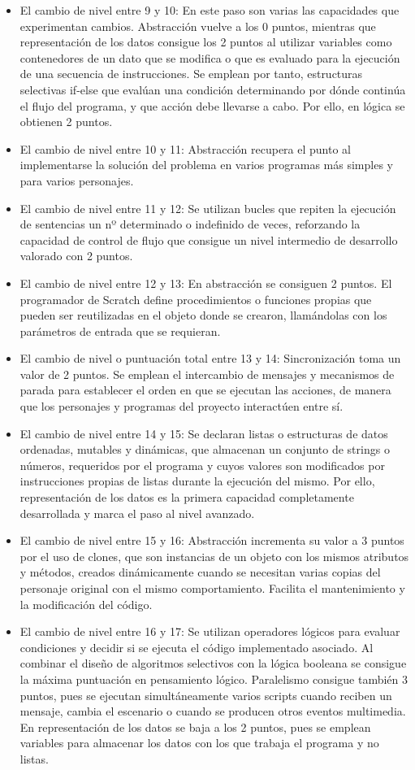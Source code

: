 \documentclass[a4paper, 12pt]{book}
\begin{document}
\begin{itemize}
 \item El cambio de nivel entre 9 y 10: En este paso son varias las capacidades que experimentan cambios. Abstracción vuelve a los 0 puntos, mientras que representación de los datos consigue los 2 puntos al utilizar variables como contenedores de un dato que se modifica o que es evaluado para la ejecución de una secuencia de instrucciones. Se emplean por tanto, estructuras selectivas if-else que evalúan una condición determinando por dónde continúa el flujo del programa, y que acción debe llevarse a cabo. Por ello, en lógica se obtienen 2 puntos.
 \item El cambio de nivel entre 10 y 11: Abstracción recupera el punto al implementarse la solución del problema en varios programas más simples y para varios personajes.
 \item El cambio de nivel entre 11 y 12: Se utilizan bucles que repiten la ejecución de sentencias un nº determinado o indefinido de veces, reforzando la capacidad de control de flujo que consigue un nivel intermedio de desarrollo valorado con 2 puntos.
 \item El cambio de nivel entre 12 y 13: En abstracción se consiguen 2 puntos. El programador de Scratch define procedimientos o funciones propias que pueden ser reutilizadas en el objeto donde se crearon, llamándolas con los parámetros de entrada que se requieran. 
 \item El cambio de nivel o puntuación total entre 13 y 14: Sincronización toma un valor de 2 puntos. Se emplean el intercambio de mensajes y mecanismos de parada para establecer el orden en que se ejecutan las acciones, de manera que los personajes y programas del proyecto interactúen entre sí.
 \item El cambio de nivel entre 14 y 15: Se declaran listas o estructuras de datos ordenadas, mutables y dinámicas, que almacenan un conjunto de strings o números, requeridos por el programa y cuyos valores son modificados por instrucciones propias de listas durante la ejecución del mismo. Por ello, representación de los datos es la primera capacidad completamente desarrollada y marca el paso al nivel avanzado.
 \item El cambio de nivel entre 15 y 16: Abstracción incrementa su valor a 3 puntos por el uso de clones, que son instancias de un objeto con los mismos atributos y métodos, creados dinámicamente cuando se necesitan varias copias del personaje original con el mismo comportamiento. Facilita el mantenimiento y la modificación del código. 
 \item El cambio de nivel entre 16 y 17: Se utilizan operadores lógicos para evaluar condiciones y decidir si se ejecuta el código implementado asociado. Al combinar el diseño de algoritmos selectivos con la lógica booleana se consigue la máxima puntuación en pensamiento lógico. Paralelismo consigue también 3 puntos, pues se ejecutan simultáneamente varios scripts cuando reciben un mensaje, cambia el escenario o cuando se producen otros eventos multimedia. En representación de los datos se baja a los 2 puntos, pues se emplean variables para almacenar los datos con los que trabaja el programa y no listas.

\end{itemize}
\end{document}
